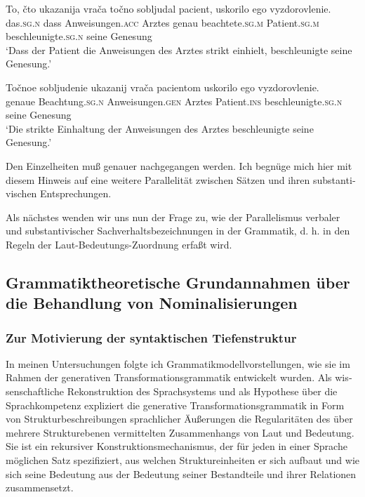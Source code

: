 \documentclass[output=paper]{langscibook}
\begin{document}
\begin{otherlanguage}{german}
\begin{exe}
     \label{ex:zi83:1''}
        \ea \label{ex:zi83:1''a}
        \gll To, čto ukazanija vrača točno sobljudal pacient, uskorilo ego vyzdorovlenie. \\
        das.\textsc{sg}.\textsc{n} dass Anweisungen.\textsc{acc}  Arztes genau beachtete.\textsc{sg}.\textsc{m} Patient.\textsc{sg}.\textsc{m} beschleunigte.\textsc{sg}.\textsc{n} seine Genesung \\
        \glt ‘Dass der Patient die Anweisungen des Arztes strikt einhielt, beschleunigte seine Genesung.’
        
        \ex \label{ex:zi83:1''b}
        \gll Točnoe sobljudenie ukazanij vrača pacientom uskorilo ego vyzdorovlenie.\\
        genaue Beachtung.\textsc{sg}.\textsc{n} Anweisungen.\textsc{gen} Arztes Patient.\textsc{ins} beschleunigte.\textsc{sg}.\textsc{n} seine Genesung\\
        \glt ‘Die strikte Einhaltung der Anweisungen des Arztes beschleunigte seine Genesung.’
        \z
\end{exe}

\noindent Den Einzelheiten muß genauer nachgegangen werden. Ich begnüge mich hier mit diesem Hinweis auf eine weitere Parallelität zwischen Sätzen und ihren substantivischen Entsprechungen.

Als nächstes wenden wir uns nun der Frage zu, wie der Parallelismus verbaler und substantivischer Sachverhaltsbezeichnungen in der Grammatik, d. h. in den Regeln der Laut-Bedeutungs-Zuordnung erfaßt wird.

\subsection{Grammatiktheoretische Grundannahmen über die Behandlung von Nominalisierungen} \label{sec:zi83:1.3}
\subsubsection{Zur Motivierung der syntaktischen Tiefenstruktur} \label{sec:zi83:1.3.1}

In meinen Untersuchungen folgte ich Grammatikmodellvorstellungen, wie sie im Rahmen der generativen Transformationsgrammatik entwickelt wurden. Als wissenschaftliche Rekonstruktion des Sprachsystems und als Hypothese über die Sprachkompetenz expliziert die generative Transformationsgrammatik in Form von Strukturbeschreibungen sprachlicher Äußerungen die Regularitäten des über mehrere Strukturebenen vermittelten Zusammenhangs von Laut und Bedeutung. Sie ist ein rekursiver Konstruktionsmechanismus, der für jeden in einer Sprache möglichen Satz spezifiziert, aus welchen Struktureinheiten er sich aufbaut und wie sich seine Bedeutung aus der Bedeutung seiner Bestandteile und ihrer
Relationen zusammensetzt.


\end{otherlanguage}
\end{document}
